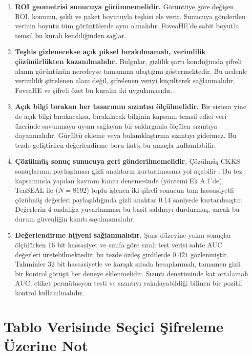 \begin{enumerate}
\item \textbf{ROI geometrisi sunucuya görünmemelidir.} Görüntüye göre değişen ROI, konumu, şekli ve paket boyutuyla teşhisi ele verir. Sunucuya gönderilen verinin boyutu tüm görüntülerde aynı olmalıdır. FoveaHE'de sabit boyutlu temsil bu kuralı kendiliğinden sağlar.
\item \textbf{Teşhis gizlenecekse açık piksel bırakılmamalı, verimlilik çözünürlükten kazanılmalıdır.} Bulgular, gizlilik şartı konduğunda şifreli alanın görüntünün neredeyse tamamına ulaştığını göstermektedir. Bu nedenle verimlilik şifrelenen alanı değil, şifrelenen veriyi küçülterek sağlanmalıdır. FoveaHE ve şifreli özet bu kuralın iki uygulamasıdır.
\item \textbf{Açık bilgi bırakan her tasarımın sızıntısı ölçülmelidir.} Bir sistem yine de açık bilgi bırakacaksa, bırakılacak bilginin kapsamı temsil edici veri üzerinde savunmaya uyum sağlayan bir saldırganla ölçülen sızıntıya dayanmalıdır. Gürültü ekleme veya bulanıklaştırma sızıntıyı gidermez. Bu tezde geliştirilen değerlendirme boru hattı bu amaçla kullanılabilir.
\item \textbf{Çözülmüş sonuç sunucuya geri gönderilmemelidir.} Çözülmüş CKKS sonuçlarının paylaşılması gizli anahtarın kurtarılmasına yol açabilir \cite{limicciancio2021,guo2024keyrecovery}. Bu tez kapsamında yapılan kavram kanıtı denemesinde (yöntemi Ek A.1'de), TenSEAL ile ($N = 8192$) toplu işlenen iki şifreli sonucun tam hassasiyetli çözülmüş değerleri paylaşıldığında gizli anahtar 0.14 saniyede kurtarılmıştır. Değerlerin 4 ondalığa yuvarlanması bu basit saldırıyı durdurmuş, ancak bu durum güvenliğin kanıtı sayılmamalıdır.
\item \textbf{Değerlendirme hijyeni sağlanmalıdır.} Şans düzeyine yakın sonuçlar ölçülürken 16 bit hassasiyet ve sınıfa göre sıralı test verisi sahte AUC değerleri üretebilmektedir; bu tezde özdeş girdilerde $0.421$ gözlenmiştir. Tahminler 32 bit hassasiyetle ve karışık sırada hesaplanmalı, tamamen gizli bir kontrol görüşü her deneye eklenmelidir. Sızıntı denetiminde kat ortalamalı AUC, etiket permütasyon testi ve sızıntıyı yakalayabildiği bilinen bir pozitif kontrol kullanılmalıdır.
\end{enumerate}

\section{Tablo Verisinde Seçici Şifreleme Üzerine Not}\label{sec:tablo}

